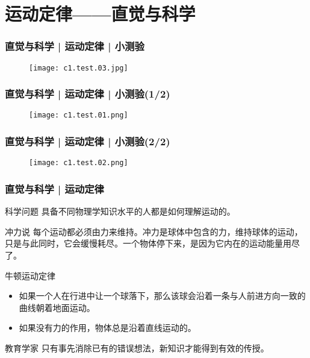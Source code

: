 \section{运动定律——直觉与科学}
\begin{frame}
  \frametitle{直觉与科学 | 运动定律 | 小测验}
  \begin{figure}
    \centering
    \texttt{[image: c1.test.03.jpg]}
  \end{figure}
\end{frame}

\begin{frame}
  \frametitle{直觉与科学 | 运动定律 | 小测验(1/2)}
  \begin{figure}
    \centering
    \texttt{[image: c1.test.01.png]}
  \end{figure}
\end{frame}

\begin{frame}
  \frametitle{直觉与科学 | 运动定律 | 小测验(2/2)}
  \begin{figure}
    \centering
    \texttt{[image: c1.test.02.png]}
  \end{figure}
\end{frame}

\begin{frame}
  \frametitle{直觉与科学 | 运动定律}
  \begin{block}{科学问题}
    具备不同物理学知识水平的人都是如何理解运动的。
  \end{block}
  \pause
  \begin{block}{冲力说}
    每个运动都必须由力来维持。冲力是球体中包含的力，维持球体的运动，只是与此同时，它会缓慢耗尽。一个物体停下来，是因为它内在的运动能量用尽了。
  \end{block}
  \pause
  \begin{block}{牛顿运动定律}
    \begin{itemize}
      \item 如果一个人在行进中让一个球落下，那么该球会沿着一条与人前进方向一致的曲线朝着地面运动。
      \item 如果没有力的作用，物体总是沿着直线运动的。
    \end{itemize}
  \end{block}
  \pause
  \begin{block}{教育学家}
    只有事先消除已有的错误想法，新知识才能得到有效的传授。
  \end{block}
\end{frame}


